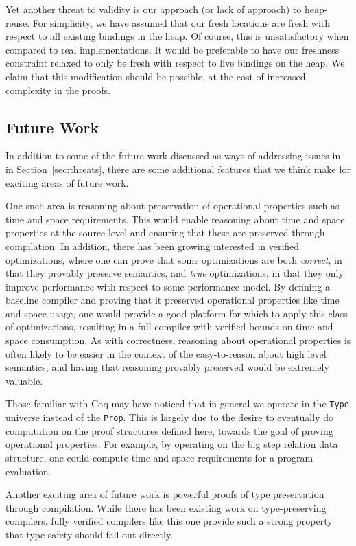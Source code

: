 Yet another threat to validity is our approach (or lack of approach) to
heap-reuse. For simplicity, we have assumed that our fresh locations are fresh
with respect to all existing bindings in the heap. Of course, this is
unsatisfactory when compared to real implementations. It would be preferable to
have our freshness constraint relaxed to only be fresh with respect to live
bindings on the heap. We claim that this modification should be possible, at the
cost of increased complexity in the proofs. 

\subsection{Future Work}

In addition to some of the future work discussed as ways of addressing issues in
in Section~\ref{sec:threats}, there are some additional features that we think
make for exciting areas of future work. 

One such area is reasoning about preservation of operational properties such as
time and space requirements. This would enable reasoning about time and space
properties at the source level and ensuring that these are preserved through
compilation. In addition, there has been growing interested in verified
optimizations, where one can prove that some optimizations are both
\emph{correct}, in that they provably preserve semantics, and \emph{true}
optimizations, in that they only improve performance with respect to some
performance model. By defining a baseline compiler and proving that it preserved
operational properties like time and space usage, one would provide a good
platform for which to apply this class of optimizations, resulting in a full
compiler with verified bounds on time and space consumption. As with
correctness, reasoning about operational properties is often likely to be easier
in the context of the easy-to-reason about high level semantics, and having that
reasoning provably preserved would be extremely valuable. 

Those familiar with Coq may have noticed that in general we operate in the
\texttt{Type} universe instead of the \texttt{Prop}. This is largely due to the
desire to eventually do computation on the proof structures defined here,
towards the goal of proving operational properties. For example, by operating on 
the big step relation data structure, one could compute time and space
requirements for a program evaluation.

Another exciting area of future work is powerful proofs of type preservation
through compilation.  While there has been existing work on type-preserving
compilers, fully verified compilers like this one provide such a strong property
that type-safety should fall out directly.
